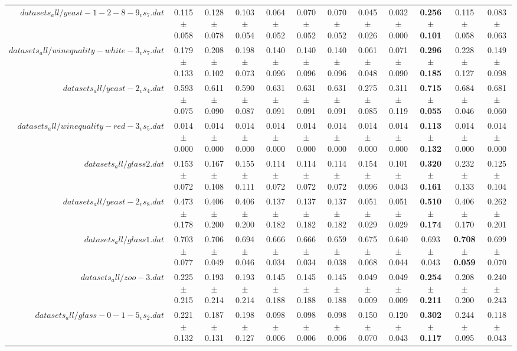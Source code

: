 \begin{table}[!ht]
{\begin{tabular}{r c c c c c c c c c c c}
$datasets_all/yeast-1-2-8-9_vs_7.dat$ & 0.115 $\pm$ 0.058 & 0.128 $\pm$ 0.078 & 0.103 $\pm$ 0.054 & 0.064 $\pm$ 0.052 & 0.070 $\pm$ 0.052 & 0.070 $\pm$ 0.052 & 0.045 $\pm$ 0.026 & 0.032 $\pm$ 0.000 & \textbf{0.256 $\pm$ 0.101} & 0.115 $\pm$ 0.058 & 0.083 $\pm$ 0.063 \\
$datasets_all/winequality-white-3_vs_7.dat$ & 0.179 $\pm$ 0.133 & 0.208 $\pm$ 0.102 & 0.198 $\pm$ 0.073 & 0.140 $\pm$ 0.096 & 0.140 $\pm$ 0.096 & 0.140 $\pm$ 0.096 & 0.061 $\pm$ 0.048 & 0.071 $\pm$ 0.090 & \textbf{0.296 $\pm$ 0.185} & 0.228 $\pm$ 0.127 & 0.149 $\pm$ 0.098 \\
$datasets_all/yeast-2_vs_4.dat$ & 0.593 $\pm$ 0.075 & 0.611 $\pm$ 0.090 & 0.590 $\pm$ 0.087 & 0.631 $\pm$ 0.091 & 0.631 $\pm$ 0.091 & 0.631 $\pm$ 0.091 & 0.275 $\pm$ 0.085 & 0.311 $\pm$ 0.119 & \textbf{0.715 $\pm$ 0.055} & 0.684 $\pm$ 0.046 & 0.681 $\pm$ 0.060 \\
$datasets_all/winequality-red-3_vs_5.dat$ & 0.014 $\pm$ 0.000 & 0.014 $\pm$ 0.000 & 0.014 $\pm$ 0.000 & 0.014 $\pm$ 0.000 & 0.014 $\pm$ 0.000 & 0.014 $\pm$ 0.000 & 0.014 $\pm$ 0.000 & 0.014 $\pm$ 0.000 & \textbf{0.113 $\pm$ 0.132} & 0.014 $\pm$ 0.000 & 0.014 $\pm$ 0.000 \\
$datasets_all/glass2.dat$ & 0.153 $\pm$ 0.072 & 0.167 $\pm$ 0.108 & 0.155 $\pm$ 0.111 & 0.114 $\pm$ 0.072 & 0.114 $\pm$ 0.072 & 0.114 $\pm$ 0.072 & 0.154 $\pm$ 0.096 & 0.101 $\pm$ 0.043 & \textbf{0.320 $\pm$ 0.161} & 0.232 $\pm$ 0.133 & 0.125 $\pm$ 0.104 \\
$datasets_all/yeast-2_vs_8.dat$ & 0.473 $\pm$ 0.178 & 0.406 $\pm$ 0.200 & 0.406 $\pm$ 0.200 & 0.137 $\pm$ 0.182 & 0.137 $\pm$ 0.182 & 0.137 $\pm$ 0.182 & 0.051 $\pm$ 0.029 & 0.051 $\pm$ 0.029 & \textbf{0.510 $\pm$ 0.174} & 0.406 $\pm$ 0.170 & 0.262 $\pm$ 0.201 \\
$datasets_all/glass1.dat$ & 0.703 $\pm$ 0.077 & 0.706 $\pm$ 0.049 & 0.694 $\pm$ 0.046 & 0.666 $\pm$ 0.034 & 0.666 $\pm$ 0.034 & 0.659 $\pm$ 0.038 & 0.675 $\pm$ 0.068 & 0.640 $\pm$ 0.044 & 0.693 $\pm$ 0.043 & \textbf{0.708 $\pm$ 0.059} & 0.699 $\pm$ 0.070 \\
$datasets_all/zoo-3.dat$ & 0.225 $\pm$ 0.215 & 0.193 $\pm$ 0.214 & 0.193 $\pm$ 0.214 & 0.145 $\pm$ 0.188 & 0.145 $\pm$ 0.188 & 0.145 $\pm$ 0.188 & 0.049 $\pm$ 0.009 & 0.049 $\pm$ 0.009 & \textbf{0.254 $\pm$ 0.211} & 0.208 $\pm$ 0.200 & 0.240 $\pm$ 0.243 \\
$datasets_all/glass-0-1-5_vs_2.dat$ & 0.221 $\pm$ 0.132 & 0.187 $\pm$ 0.131 & 0.198 $\pm$ 0.127 & 0.098 $\pm$ 0.006 & 0.098 $\pm$ 0.006 & 0.098 $\pm$ 0.006 & 0.150 $\pm$ 0.070 & 0.120 $\pm$ 0.043 & \textbf{0.302 $\pm$ 0.117} & 0.244 $\pm$ 0.095 & 0.118 $\pm$ 0.043 \\

\end{tabular}}
\end{table}

